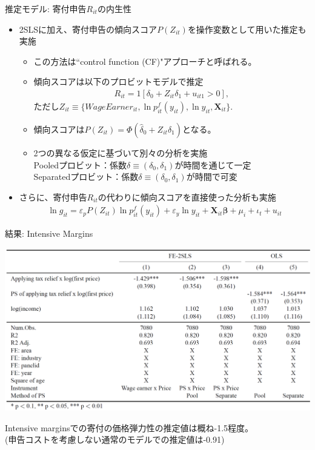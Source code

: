 \documentclass[dvipdfmx,10pt]{beamer}
\begin{document}
\begin{frame}{推定モデル: 寄付申告$R_{it}$の内生性}
	\begin{itemize}
		\item 2SLSに加え、寄付申告の傾向スコア$P(Z_{it})$を操作変数として用いた推定も実施
		\begin{itemize}
			\item この方法は``control function (CF)"アプローチと呼ばれる。
			\item 傾向スコアは以下のプロビットモデルで推定
			\begin{align}
				R_{it}=1[\delta_0+Z_{it}\delta_1+u_{it1}>0]\tag{8},
			\end{align}
			ただし$Z_{it}\equiv \{WageEarner_{it}, \ln p_{it}^f(y_{it}), \ln y_{it}, \bm{X}_{it}\}$.
			\item 傾向スコアは$P(Z_{it})=\Phi(\hat{\delta}_0+Z_{it}\hat{\delta}_1)$となる。
			\item 2つの異なる仮定に基づいて別々の分析を実施\\
			  Pooledプロビット：係数$\delta\equiv (\delta_0, \delta_1)$が時間を通じて一定\\
			  Separatedプロビット：係数$\delta\equiv (\delta_0, \delta_1)$が時間で可変
		\end{itemize}
		\item さらに、寄付申告$R_{it}$の代わりに傾向スコアを直接使った分析も実施
		\begin{align}
			\ln g_{it} = \varepsilon_pP(Z_{it})\ln p_{it}^f(y_{it}) + \varepsilon_y \ln y_{it} + \bm{X}_{it}\bm{\beta} + \mu_i + \iota_t + u_{it}\tag{9}
		\end{align}
	\end{itemize}
\end{frame}

\begin{frame}{結果: Intensive Margins}
	\begin{table}
		\centering
		\includegraphics[width=0.9\linewidth]{Tab_res_1}
		\caption{First-Price Elasticities (Intensive Margins)}
		\label{tab:2}
	\end{table}
Intensive marginsでの寄付の価格弾力性の推定値は概ね-1.5程度。\\
(申告コストを考慮しない通常のモデルでの推定値は-0.91)
\end{frame}
\end{document}

